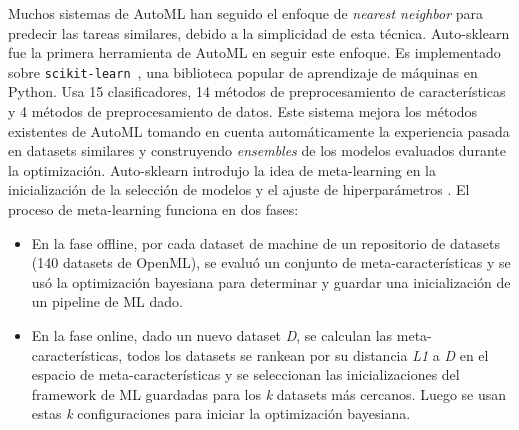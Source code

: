 Muchos sistemas de AutoML han seguido el enfoque de \textit{nearest neighbor} para predecir las tareas similares, debido a la simplicidad de esta técnica. Auto-sklearn \cite{fuerer2015efficient} fue la primera herramienta de AutoML en seguir este enfoque. Es implementado sobre \texttt{scikit-learn}~\cite{scikit-learn}, una biblioteca popular de aprendizaje de máquinas en Python. Usa 15 clasificadores, 14 métodos de preprocesamiento de características  y 4 métodos de preprocesamiento de datos. Este sistema mejora los métodos existentes de AutoML tomando en cuenta automáticamente la experiencia pasada en datasets similares y construyendo \textit{ensembles} de los modelos evaluados durante la optimización. Auto-sklearn introdujo la idea de meta-learning en la inicialización de la selección de modelos y el ajuste de hiperparámetros \cite{vanschoren2018metalearning}.  El proceso de meta-learning funciona en dos fases:

\begin{itemize}
	\item En la fase offline, por cada dataset de machine de un repositorio de datasets (140 datasets de OpenML), se evaluó un conjunto de meta-características  y se usó la optimización bayesiana para determinar y guardar una inicialización de un pipeline de ML dado.
	\item En la fase online, dado un nuevo dataset \textit{D}, se calculan las meta-características, todos los datasets se rankean por su distancia \textit{L1} a \textit{D} en el espacio de meta-características y se seleccionan las inicializaciones del framework de ML guardadas para los \textit{k} datasets más cercanos. Luego se usan estas \textit{k} configuraciones para iniciar la optimización bayesiana.
\end{itemize}

